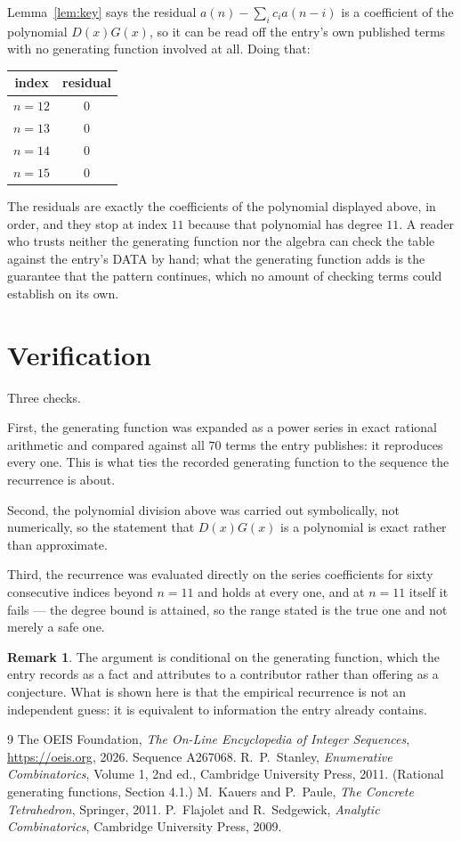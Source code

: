 \documentclass[11pt,a4paper]{article}
\theoremstyle{plain}
\theoremstyle{definition}
\newtheorem{remark}[theorem]{Remark}
\begin{document}
Lemma~\ref{lem:key} says the residual $a(n)-\sum_ic_ia(n-i)$ is a coefficient of the
polynomial $D(x)G(x)$, so it can be read off the entry's own published terms with no
generating function involved at all. Doing that:
\begin{center}
\begin{tabular}{cc}
index & residual \\ \hline
$n=12$ & $0$ \\
$n=13$ & $0$ \\
$n=14$ & $0$ \\
$n=15$ & $0$
\end{tabular}
\end{center}
The residuals are exactly the coefficients of the polynomial displayed above, in order, and
they stop at index $11$ because that polynomial has degree $11$. A reader who trusts
neither the generating function nor the algebra can check the table against the entry's DATA
by hand; what the generating function adds is the guarantee that the pattern continues, which
no amount of checking terms could establish on its own.

\section{Verification}

Three checks.

First, the generating function was expanded as a power series in exact rational arithmetic and
compared against all $70$ terms the entry publishes: it reproduces every one. This is
what ties the recorded generating function to the sequence the recurrence is about.

Second, the polynomial division above was carried out symbolically, not numerically, so the
statement that $D(x)G(x)$ is a polynomial is exact rather than approximate.

Third, the recurrence was evaluated directly on the series coefficients for sixty consecutive
indices beyond $n=11$ and holds at every one, and at $n=11$ itself it fails --- the
degree bound is attained, so the range stated is the true one and not merely a safe one.

\begin{remark}
The argument is conditional on the generating function, which the entry records as a fact and
attributes to a contributor rather than offering as a conjecture. What is shown here is that
the empirical recurrence is not an independent guess: it is equivalent to information the
entry already contains.
\end{remark}

\begin{thebibliography}{9}
 The OEIS Foundation, \emph{The On-Line Encyclopedia of Integer
Sequences}, \url{https://oeis.org}, 2026. Sequence A267068.
 R.~P.~Stanley, \emph{Enumerative Combinatorics}, Volume 1, 2nd ed.,
Cambridge University Press, 2011. (Rational generating functions, Section 4.1.)
 M.~Kauers and P.~Paule, \emph{The Concrete Tetrahedron}, Springer, 2011.
 P.~Flajolet and R.~Sedgewick, \emph{Analytic Combinatorics}, Cambridge
University Press, 2009.
\end{thebibliography}
\end{document}
